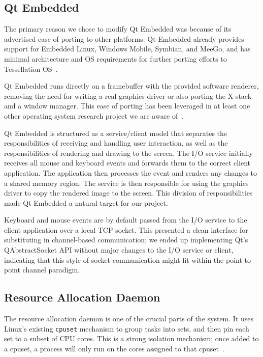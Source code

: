 \documentclass[letterpaper,twocolumn,11pt]{article}
\begin{document}
\subsection{Qt Embedded}

The primary reason we chose to modify Qt Embedded was because of its advertised ease of porting to other platforms. Qt Embedded already provides support for Embedded Linux, Windows Mobile, Symbian, and MeeGo, and has minimal architecture and OS requirements for further porting efforts to Tessellation OS~\cite{qtembedded}.

 Qt Embedded runs directly on a framebuffer with the provided software renderer, removing the need for writing a real graphics driver or also porting the X stack and a window manager. This ease of porting has been leveraged in at least one other operating system research project we are aware of~\cite{ibos}. 

Qt Embedded is structured as a service/client model that separates the responsibilities of receiving and handling user interaction, as well as the responsibilities of rendering and drawing to the screen. The I/O service initially receives all mouse and keyboard events and forwards them to the correct client application. The application then processes the event and renders any changes to a shared memory region. The service is then responsible for using the graphics driver to copy the rendered image to the screen. This division of responsibilities made Qt Embedded a natural target for our project.

Keyboard and mouse events are by default passed from the I/O service to the client application over a local TCP socket. This presented a clean interface for substituting in channel-based communication; we ended up implementing Qt's QAbstractSocket API without major changes to the I/O service or client, indicating that this style of socket communication might fit within the point-to-point channel paradigm.

\subsection{Resource Allocation Daemon}

The resource allocation daemon is one of the crucial parts of the system. It uses Linux's existing {\tt cpuset} mechanism to group tasks into sets, and then pin each set to a subset of CPU cores. This is a strong isolation mechanism; once added to a cpuset, a process will only run on the cores assigned to that cpuset~\cite{cpusets}.
\end{document}
